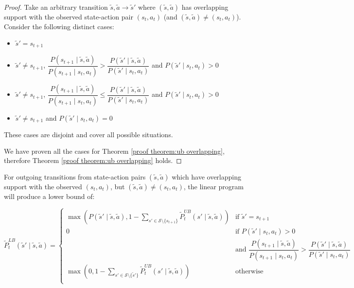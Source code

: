 \begin{proof} 
Take an arbitrary transition $\tilde{s}, \tilde{a} \rightarrow \tilde{s}'$ where $(\tilde{s}, \tilde{a})$ has overlapping support with the observed state-action pair $(s_t, a_t)$ (and $(\tilde{s}, \tilde{a}) \neq (s_t, a_t)$). Consider the following distinct cases:
\begin{itemize}
    \item $\tilde{s}' = s_{t+1}$
    \item $\tilde{s}' \neq s_{t+1}$, $\dfrac{P(s_{t+1} \mid \tilde{s}, \tilde{a})}{P(s_{t+1} \mid s_t, a_t)}>\dfrac{P(\tilde{s}' \mid \tilde{s}, \tilde{a})}{P(\tilde{s}' \mid s_t, a_t)}$ and $P(\tilde{s}' \mid s_t, a_t) > 0$
    \item $\tilde{s}' \neq s_{t+1}$, $\dfrac{P(s_{t+1} \mid \tilde{s}, \tilde{a})}{P(s_{t+1} \mid s_t, a_t)}\leq\dfrac{P(\tilde{s}' \mid \tilde{s}, \tilde{a})}{P(\tilde{s}' \mid s_t, a_t)}$ and $P(\tilde{s}' \mid s_t, a_t) >0$
    \item $\tilde{s}' \neq s_{t+1}$ and $P(\tilde{s}' \mid s_t, a_t) =0$
\end{itemize}
These cases are disjoint and cover all possible situations.









We have proven all the cases for Theorem \ref{proof theorem:ub overlapping}, therefore Theorem \ref{proof theorem:ub overlapping} holds.

\end{proof}

\pagebreak
\begin{theorem}
\label{proof theorem:lb overlapping}
For outgoing transitions from state-action pairs $(\tilde{s}, \tilde{a})$ which have overlapping support with the observed $(s_t, a_t)$, but $(\tilde{s}, \tilde{a}) \neq (s_t, a_t)$, the linear program will produce a lower bound of:

\[\tilde{P}_{t}^{LB}(\tilde{s}' \mid \tilde{s}, \tilde{a}) = 
\begin{cases}
\max(P(\tilde{s}' \mid \tilde{s}, \tilde{a}), 1 - \sum_{s' \in \mathcal{S}\setminus\{s_{t+1}\}}{\tilde{P}_{t}^{UB}(s' \mid \tilde{s}, \tilde{a})}) & \text{if $\tilde{s}' = s_{t+1}$}\\
0 & \text{if $P(\tilde{s}' \mid s_t, a_t) > 0$} \\ & \text{and $\dfrac{P(s_{t+1} \mid \tilde{s}, \tilde{a})}{P(s_{t+1} \mid s_t, a_t)}>\dfrac{P(\tilde{s}' \mid \tilde{s}, \tilde{a})}{P(\tilde{s}' \mid s_t, a_t)}$}\\
\max(0, 1 - \sum_{s' \in \mathcal{S}\setminus\{\tilde{s}'\}}{\tilde{P}_{t}^{UB}(s' \mid \tilde{s}, \tilde{a})}) & \text{otherwise}\\
\end{cases}
\]
\end{theorem}


